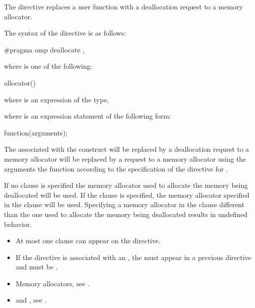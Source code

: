\begin{ccppspecific}

\summary

The  directive replaces a user function with a deallocation request to a memory allocator.

\syntax
The syntax of the  directive is as follows:

\begin{boxedcode}
\#pragma omp deallocate \plc{[clause[ [ [},\plc{] clause] ... ]] new-line}
\end{boxedcode}


where  is one of the following:

\begin{indentedcodelist}
allocator()
\end{indentedcodelist}

where  is an expression of the  type,

where  is an expression statement of the following form:
\begin{codepar}
    function(arguments);
\end{codepar}


\descr

The  associated with the construct will be replaced by a deallocation request to a memory allocator will be replaced by a request to a memory allocator using the arguments the function according to the specification of the  directive for . 

If no  clause is specified the memory allocator used to allocate the memory being deallocated will be used. If the  clause is specified, the memory allocator specified in the clause will be used. Specifying a memory allocator in the  clause different than the one used to allocate the memory being deallocated results in undefined behavior.

\restrictions
\begin{itemize}
\item At most one  clause can appear on the  directive.
\item If the directive is associated with an , the  must appear in a previous  directive and  must be .
\end{itemize}

\crossreferences
\begin{itemize}
\item Memory allocators, see .
\item {} and , see .
\end{itemize}

\end{ccppspecific}

